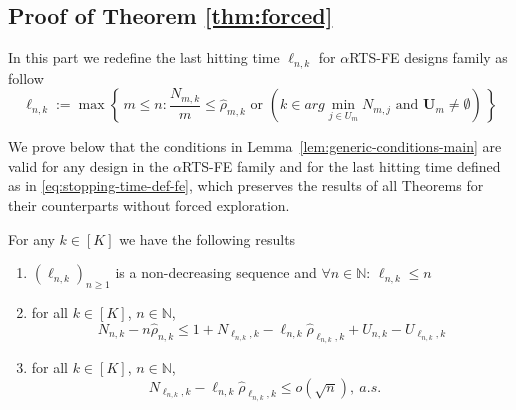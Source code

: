 
\subsection{Proof of Theorem \ref{thm:forced}}
In this part we redefine the last hitting time $\ell_{n,k}$ for \(\alpha\)RTS-FE designs family as follow
\begin{equation}\label{eq:stopping-time-def-fe}
	\ell_{n,k} := \max \left\{\, m \leq n : \frac{N_{m,k}}{m} \leq \hat{\rho}_{m,k} \text{ or } \left(k \in arg\!\min_{j \in U_m} N_{m,j}\text{ and } \mathbf{U}_m \neq \emptyset\right) \,\right\}
\end{equation}

We prove below that the conditions in Lemma~\ref{lem:generic-conditions-main} are valid for any design in the \(\alpha\)RTS-FE family and for the last hitting time defined as in \eqref{eq:stopping-time-def-fe}, which preserves the results of all Theorems for their counterparts without forced exploration.

\begin{lemma}\label{lem:preliminary2}
	For any \(k \in [K]\) we have the following results
	\begin{enumerate}[label=(\roman*)]
		\item \(\left(\ell_{n,k}\right)_{n \geq 1}\) is a non-decreasing sequence and \(\forall n \in \mathbb{N}: \,\ell_{n,k} \leq n\)
		\item for all $k\in [K]$, $n \in \mathbb{N}$,\begin{equation}\label{eq:prelim-4}
			N_{n,k} - n\hat{\rho}_{n,k} \leq 1+N_{\ell_{n,k},k} - \ell_{n,k} \hat{\rho}_{\ell_{n,k},k} + U_{n,k} - U_{\ell_{n,k},k}
		\end{equation}
		\item for all $k\in [K]$, $n \in \mathbb{N}$,
		\begin{equation}\label{eq:condition}
			N_{\ell_{n,k},k} - \ell_{n,k} \hat{\rho}_{\ell_{n,k},k} \leq o(\sqrt{n}), \ a.s.
			\quad
		\end{equation}
	\end{enumerate}
\end{lemma}

